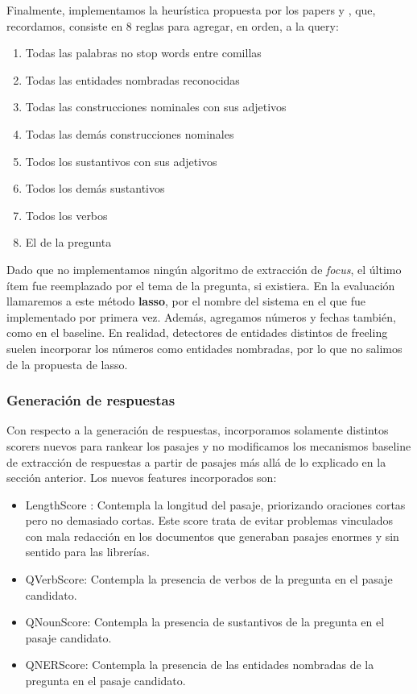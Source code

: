 Finalmente, implementamos la heurística propuesta por los papers \cite{QA1} y \cite{QA3}, que, recordamos, consiste en 8 reglas para agregar, en orden, a la query:

\begin{enumerate}
\item Todas las palabras no stop words entre comillas
\item Todas las entidades nombradas reconocidas
\item Todas las construcciones nominales con sus adjetivos
\item Todas las demás construcciones nominales
\item Todos los sustantivos con sus adjetivos
\item Todos los demás sustantivos
\item Todos los verbos
\item El  de la pregunta
\end{enumerate}

Dado que no implementamos ningún algoritmo de extracción de \textit{focus}, el último ítem fue reemplazado por el tema de la pregunta, si existiera.  En la evaluación llamaremos a este método \textbf{lasso}, por el nombre del sistema en el que fue implementado por primera vez. Además, agregamos números y fechas también, como en el baseline. En realidad, detectores de entidades distintos de freeling suelen incorporar los números como entidades nombradas, por lo que no salimos de la propuesta de lasso.

\subsubsection{Generación de respuestas}

Con respecto a la generación de respuestas, incorporamos solamente distintos scorers nuevos para rankear los pasajes y no modificamos los mecanismos baseline de extracción de respuestas a partir de pasajes más allá de lo explicado en la sección anterior.
Los nuevos features incorporados son:

\begin{itemize}
\item LengthScore : Contempla la longitud del pasaje, priorizando oraciones cortas pero no demasiado cortas. Este score trata de evitar problemas vinculados con mala redacción en los documentos que generaban pasajes enormes y sin sentido para las librerías.
\item QVerbScore: Contempla la presencia de verbos de la pregunta en el pasaje candidato.
\item QNounScore: Contempla la presencia de sustantivos de la pregunta en el pasaje candidato.
\item QNERScore: Contempla la presencia de las entidades nombradas de la pregunta en el pasaje candidato.
\end{itemize}

